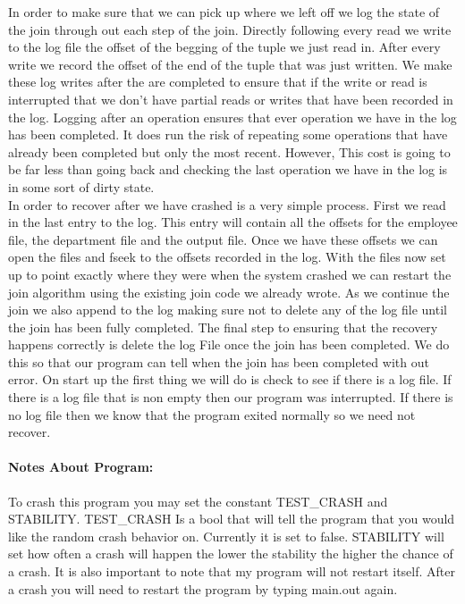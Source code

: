 \documentclass[11pt]{article}
\begin{document}
In order to make sure that we can pick up where we left off we log the state of the join through out each step of the join. Directly following every read we write to the log file the offset of the begging of the tuple we just read in. After every write we record the offset of the end of the tuple that was just written. We make these log writes after the are completed to ensure that if the write or read is interrupted that we don't have partial reads or writes that have been recorded in the log. Logging after an operation ensures that ever operation we have in the log has been completed. It does run the risk of repeating some operations that have already been completed but only the most recent. However, This cost is going to be far less than going back and checking the last operation we have in the log is in some sort of dirty state.\\

In order to recover after we have crashed is a very simple process. First we read in the last entry to the log. This entry will contain all the offsets for the employee file, the department file and the output file. Once we have these offsets we can open the files and fseek to the offsets recorded in the log. With the files now set up to point exactly where they were when the system crashed we can restart the join algorithm using the existing join code we already wrote. As we continue the join we also append to the log making sure not to delete any of the log file until the join has been fully completed. The final step to ensuring that the recovery happens correctly is delete the log File once the join has been completed. We do this so that our program can tell when the join has been completed with out error. On start up the first thing we will do is check to see if there is a log file. If there is a log file that is non empty then our program was interrupted. If there is no log file then we know that the program exited normally so we need not recover.\\

\paragraph{Notes About Program:} \hfill \break
To crash this program you may set the constant TEST\_CRASH and STABILITY. TEST\_CRASH Is a bool that will tell the program that you would like the random crash behavior on. Currently it is set to false. STABILITY will set how often a crash will happen the lower the stability the higher the chance of a crash. It is also important to note that my program will not restart itself. After a crash you will need to restart the program by typing main.out again.\\
\end{document}
